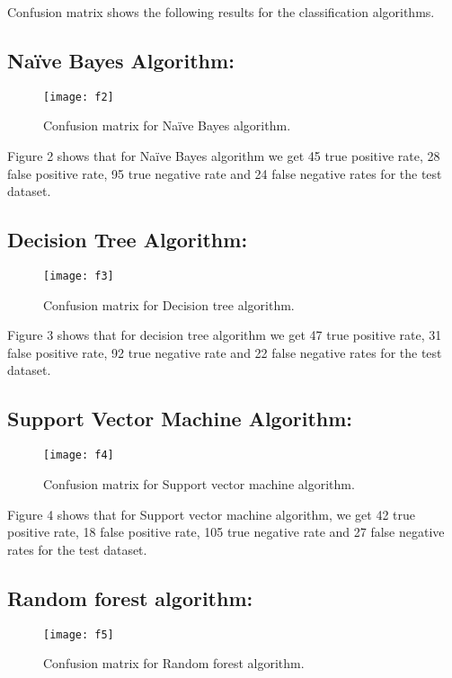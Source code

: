 \documentclass[conference]{IEEEtran}
\begin{document}
	Confusion matrix shows the following results
	for the classification algorithms.
	
\subsection{Naïve Bayes Algorithm:}
	
\begin{figure}[!h]
		\centering
		\texttt{[image: f2]}
		\caption{Confusion matrix for Naïve Bayes algorithm.}
\end{figure}
	Figure 2 shows that for Naïve Bayes algorithm we get 45 true positive rate, 28 false positive rate, 95 true negative rate and
	24 false negative rates for the test dataset.
	
\subsection{Decision Tree Algorithm:}
	
\begin{figure}[!h]
		\centering
		\texttt{[image: f3]}
		\caption{Confusion matrix for Decision tree algorithm.}
\end{figure}
	Figure 3 shows that for decision tree algorithm we get 47 true positive rate, 31 false positive rate, 92 true negative rate and 22 false negative rates for the test dataset.
	
\subsection{Support Vector Machine Algorithm:}
	
\begin{figure}[!h]
		\centering
		\texttt{[image: f4]}
		\caption{Confusion matrix for Support vector machine algorithm.}
\end{figure}
	
	Figure 4 shows that for Support vector machine algorithm, we get 42 true positive rate, 18 false positive rate, 105 true negative rate and 27 false negative rates for the test dataset.
	
\subsection{Random forest algorithm:}
	
\begin{figure}[!h]
		\centering
		\texttt{[image: f5]}
		\caption{Confusion matrix for Random forest algorithm.}
\end{figure}
	
\end{document}
